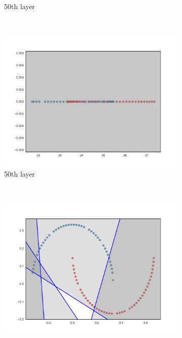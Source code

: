 \begin{figure}[h!]
\begin{subfigure}[b]{0.3\textwidth}
        \caption{\SepLayer 50th layer}
        \label{fig:layerwiseInit501}
    \end{subfigure}
    ~ %
    \begin{subfigure}[b]{0.3\textwidth}
        \includegraphics[width=\textwidth]{img/init/layerwise/conv2d_50-2.pdf}
        \caption{\SepLayer 50th layer}
        \label{fig:layerwiseInit502}
    \end{subfigure}
    \\
    \begin{subfigure}[b]{0.3\textwidth}
        \includegraphics[width=\textwidth]{img/init/unitpointwise/conv2d_1-0.pdf}

\end{subfigure}
\end{figure}

